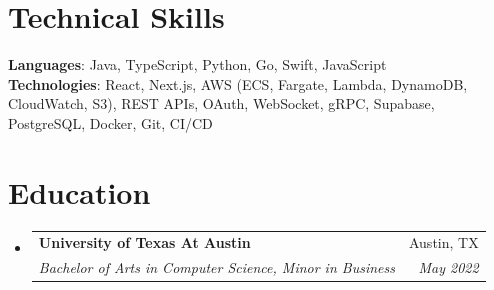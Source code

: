 \documentclass[letterpaper,11pt]{article}
\makeatletter
\newcommand{\resumeSubheading}[4]{
  \vspace{-2pt}\item
    \begin{tabular*}{0.97\textwidth}[t]{l@{\extracolsep{\fill}}r}
      \textbf{#1} & #2 \\
      \textit{\small#3} & \textit{\small #4} \\
    \end{tabular*}\vspace{-7pt}
}
\newcommand{\resumeSubHeadingListStart}{\begin{itemize}[leftmargin=0.15in, label={}]}
\newcommand{\resumeSubHeadingListEnd}{\end{itemize}}
\makeatother
\begin{document}
\section{Technical Skills}
 \begin{itemize}[leftmargin=0.15in, label={}]
    \small{\item{
     \textbf{Languages}{: Java, TypeScript, Python, Go, Swift, JavaScript} \\
     \textbf{Technologies}{: React, Next.js, AWS (ECS, Fargate, Lambda, DynamoDB, CloudWatch, S3), REST APIs, OAuth, WebSocket, gRPC, Supabase, PostgreSQL, Docker, Git, CI/CD}
    }}
 \end{itemize}


\section{Education}
  \resumeSubHeadingListStart
    \resumeSubheading
      {University of Texas At Austin}{Austin, TX}
      {Bachelor of Arts in Computer Science, Minor in Business}{May 2022}
  \resumeSubHeadingListEnd


\end{document}
